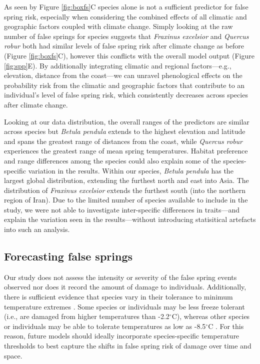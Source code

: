 \documentclass{article}\usepackage[]{graphicx}\usepackage[]{color}
\begin{document}
As seen by Figure \ref{fig:boxfs}C species alone is not a sufficient predictor for false spring risk, especially when considering the combined effects of all climatic and geographic factors coupled with climate change. Simply looking at the raw number of false springs for species suggests that \textit{Fraxinus excelsior} and \textit{Quercus robur} both had similar levels of false spring risk after climate change as before (Figure \ref{fig:boxfs}C), however this conflicts with the overall model output (Figure \ref{fig:spp}E). By additionally integrating climatic and regional factors---e.g., elevation, distance from the coast---we can unravel phenological effects on the probability risk from the climatic and geographic factors that contribute to an individual's level of false spring risk, which consistently decreases across species after climate change.

Looking at our data distribution, the overall ranges of the predictors are similar across species but \textit{Betula pendula} extends to the highest elevation and latitude and spans the greatest range of distances from the coast, while \textit{Quercus robur} experiences the greatest range of mean spring temperatures. Habitat preference and range differences among the species could also explain some of the species-specific variation in the results. Within our species, \textit{Betula pendula} has the largest global distribution, extending the furthest north and east into Asia. The distribution of \textit{Fraxinus excelsior} extends the furthest south (into the northern region of Iran). Due to the limited number of species available to include in the study, we were not able to investigate inter-specific differences in traits---and explain the variation seen in the results---without introducing statisitical artefacts into such an analysis.   

\subsection*{Forecasting false springs}
Our study does not assess the intensity or severity of the false spring events observed nor does it record the amount of damage to individuals. Additionally, there is sufficient evidence that species vary in their tolerance to minimum temperature extremes \citep{Korner2016, Lenz2013, Zhuo2018,bennett2018globtherm}. Some species or individuals may be less freeze tolerant (i.e., are damaged from higher temperatures than -2.2$^{\circ}$C), whereas other species or individuals may be able to tolerate temperatures as low as -8.5$^{\circ}$C \citep{Lenz2016}. For this reason, future models should ideally incorporate species-specific temperature thresholds to best capture the shifts in false spring risk of damage over time and space. 
\end{document}
